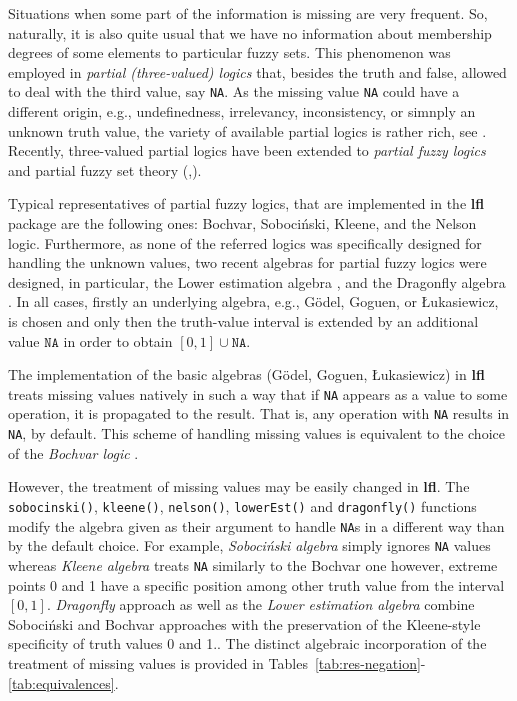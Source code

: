 \documentclass[review]{elsarticle}
\newcommand{\pkg}[1]{\textbf{#1}}
\newcommand{\code}[1]{\texttt{#1}}
\begin{document}
Situations when some part of the information is missing are very frequent. So, naturally, it is also quite usual that we have no information about membership degrees of some elements to particular fuzzy sets. This phenomenon was employed in \emph{partial (three-valued) logics} that, besides the truth and false, allowed to deal with the third value, say \code{NA}. As the missing value \code{NA} could have a different origin, e.g., undefinedness, irrelevancy, inconsistency, or simnply an unknown truth value, the variety of available partial logics is rather rich, see
\cite{CiucciDubois_Inf.Sci2013}. Recently, three-valued partial logics have been extended to \emph{partial fuzzy logics} and partial fuzzy set theory (\cite{BehounekNovak:IEEE15},\cite{BehounekDankova:IPMU16}). 

Typical representatives of partial fuzzy logics, that are implemented in the \pkg{lfl} package are the following ones:  Bochvar, Soboci\'{n}ski, Kleene, and the Nelson logic. Furthermore, as none of the referred logics was specifically designed for handling the unknown values, two recent algebras for partial fuzzy logics were designed, in particular, the Lower estimation algebra \citep{CaoStep:KSE18}, and the Dragonfly algebra \citep{Step_etal_Dragon_IJAR2019}. In all cases, firstly an underlying algebra, e.g., G\"{o}del, Goguen, or \L{}ukasiewicz, is chosen and only then the truth-value interval is extended by an additional value $\texttt{NA}$ in order to obtain $[0,1]\cup \texttt{NA}$.

The implementation of the basic algebras (G\"odel, Goguen, \L ukasiewicz) in \pkg{lfl} treats missing values natively in such a way that if \code{NA} appears as a value to some operation,
it is propagated to the result. That is, any operation with \code{NA} results in \code{NA}, by default.
This scheme of handling missing values is equivalent to the choice of the \emph{Bochvar logic} \citep{book:malinov}.

However, the treatment of missing values may be easily changed in \pkg{lfl}. The \code{sobocinski()}, \code{kleene()}, \code{nelson()}, \code{lowerEst()} and \code{dragonfly()} functions modify the algebra given as their argument to
handle \code{NA}s in a different way than by the default choice. For example, \emph{Soboci\'{n}ski algebra} simply ignores \code{NA} values whereas \emph{Kleene algebra} treats \code{NA} similarly to the Bochvar one however, extreme points 0 and 1 have a specific position among other truth value from the interval $[0,1]$. \emph{Dragonfly} approach as well as the \emph{Lower estimation algebra} combine 
Soboci\'{n}ski and Bochvar approaches with the preservation of the Kleene-style specificity of truth values 0 and 1.. The distinct algebraic incorporation of the treatment of missing values is provided in Tables~\ref{tab:res-negation}-\ref{tab:equivalences}.
\end{document}
